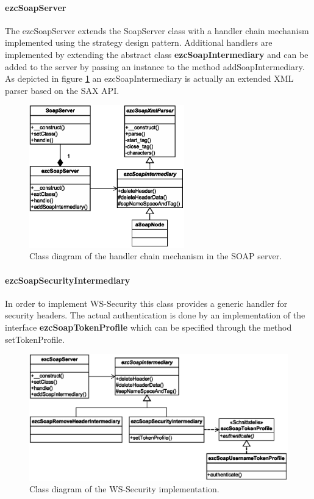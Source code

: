 \documentclass[10pt,final,a4paper,oneside]{article}
\begin{document}
\paragraph{ezcSoapServer}
The ezcSoapServer extends the SoapServer class
with a handler chain mechanism implemented using the strategy design pattern.
Additional handlers are implemented
by extending the abstract class \textbf{ezcSoapIntermediary}
and can be added to the server
by passing an instance to the method addSoapIntermediary.
As depicted in figure \ref{fig:ezcSoapServer.class-diagram}
an ezcSoapIntermediary is actually
an extended XML parser based on the SAX API.

\begin{figure}[htbp]
	\centering
		\includegraphics[width=0.60\textwidth]{figures/ezcSoapServer.class-diagram.eps}
	\caption{Class diagram of the handler chain mechanism in the SOAP server.}
	\label{fig:ezcSoapServer.class-diagram}
\end{figure}

\paragraph{ezcSoapSecurityIntermediary}
In order to implement WS-Security
this class provides a generic handler
for security headers.
The actual authentication is done
by an implementation of the interface
\textbf{ezcSoapTokenProfile}
which can be specified 
through the method setTokenProfile.

\begin{figure}[htbp]
	\centering
		\includegraphics[width=1.00\textwidth]{figures/ezcSoapServer-with-WS-Security.class-diagram.eps}
	\caption{Class diagram of the WS-Security implementation.}
	\label{fig:ezcSoapServer-with-WS-Security.class-diagram}
\end{figure}
\end{document}
